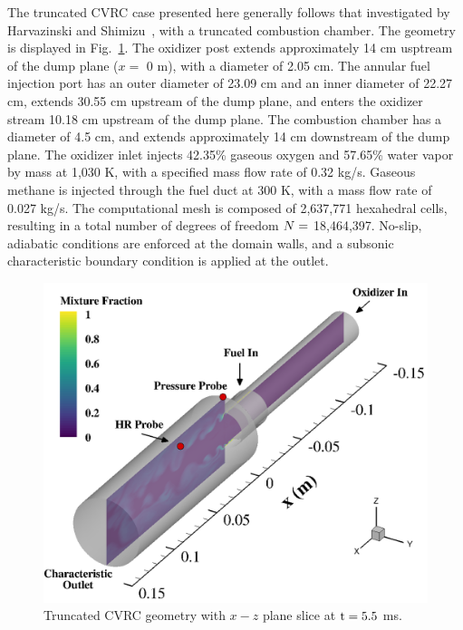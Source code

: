 The truncated CVRC case presented here generally follows that investigated by Harvazinski and Shimizu~\cite{HarvazinskiCVRCflamelet}, with a truncated combustion chamber. The geometry is displayed in Fig.~\ref{fig:cvrcGeom}. The oxidizer post extends approximately 14 cm usptream of the dump plane ($x = $ 0 m), with a diameter of 2.05 cm. The annular fuel injection port has an outer diameter of 23.09 cm and an inner diameter of 22.27 cm, extends 30.55 cm upstream of the dump plane, and enters the oxidizer stream 10.18 cm upstream of the dump plane. The combustion chamber has a diameter of 4.5 cm, and extends approximately 14 cm downstream of the dump plane. The oxidizer inlet injects 42.35\% gaseous oxygen and 57.65\% water vapor by mass at 1,030 K, with a specified mass flow rate of 0.32 kg/s. Gaseous methane is injected through the fuel duct at 300 K, with a mass flow rate of 0.027 kg/s. The computational mesh is composed of 2,637,771 hexahedral cells, resulting in a total number of degrees of freedom $N =$ 18,464,397. No-slip, adiabatic conditions are enforced at the domain walls, and a subsonic characteristic boundary condition is applied at the outlet.

\begin{figure}
	\centering
	\includegraphics[width=0.8\linewidth]{Chapters/CavityAndCVRC/Images/cvrc/geom_hrProbe.png}
    \caption{\label{fig:cvrcGeom}
	Truncated CVRC geometry with $x-z$ plane slice at $\text{t} = 5.5$ ms.}
\end{figure}

